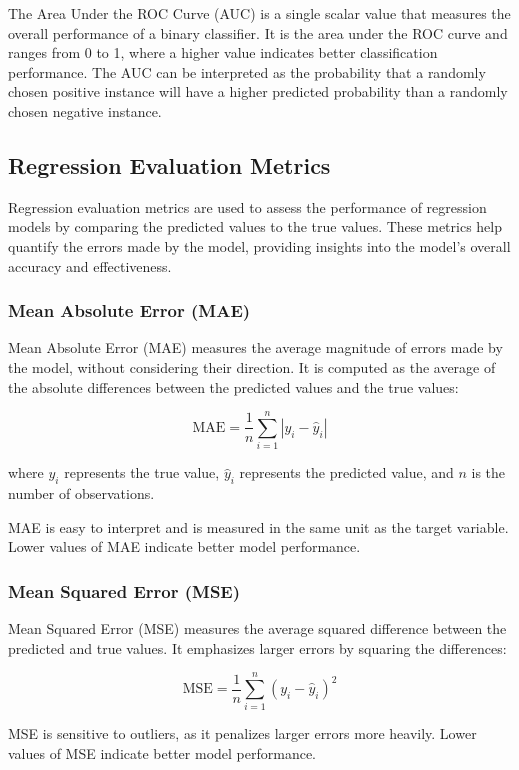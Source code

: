 \documentclass[12pt]{article}
\begin{document}
The Area Under the ROC Curve (AUC) is a single scalar value that measures the overall performance of a binary classifier. It is the area under the ROC curve and ranges from 0 to 1, where a higher value indicates better classification performance. The AUC can be interpreted as the probability that a randomly chosen positive instance will have a higher predicted probability than a randomly chosen negative instance.


\subsection{Regression Evaluation Metrics}

Regression evaluation metrics are used to assess the performance of regression models by comparing the predicted values to the true values. These metrics help quantify the errors made by the model, providing insights into the model's overall accuracy and effectiveness.
\subsubsection{Mean Absolute Error (MAE)}

Mean Absolute Error (MAE) measures the average magnitude of errors made by the model, without considering their direction. It is computed as the average of the absolute differences between the predicted values and the true values:

$$ \text{MAE} = \frac{1}{n} \sum_{i=1}^{n} |y_i - \hat{y}_i| $$

where $y_i$ represents the true value, $\hat{y}_i$ represents the predicted value, and $n$ is the number of observations.

MAE is easy to interpret and is measured in the same unit as the target variable. Lower values of MAE indicate better model performance.

\subsubsection{Mean Squared Error (MSE)}

Mean Squared Error (MSE) measures the average squared difference between the predicted and true values. It emphasizes larger errors by squaring the differences:

$$ \text{MSE} = \frac{1}{n} \sum_{i=1}^{n} (y_i - \hat{y}_i)^2 $$

MSE is sensitive to outliers, as it penalizes larger errors more heavily. Lower values of MSE indicate better model performance.
\end{document}
